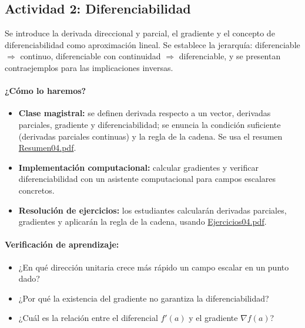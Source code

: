 \documentclass[a4,11pt]{aleph-notas}
\begin{document}
\subsection*{Actividad 2: Diferenciabilidad}
Se introduce la derivada direccional y parcial, el gradiente y el concepto de diferenciabilidad como aproximación lineal. Se establece la jerarquía: diferenciable $\Rightarrow$ continuo, diferenciable con continuidad $\Rightarrow$ diferenciable, y se presentan contraejemplos para las implicaciones inversas.

\paragraph{¿Cómo lo haremos?}
\begin{itemize}[leftmargin=*]
    \item \textbf{Clase magistral:} se definen derivada respecto a un vector, derivadas parciales, gradiente y diferenciabilidad; se enuncia la condición suficiente (derivadas parciales continuas) y la regla de la cadena. Se usa el resumen \href{https://andres-merino.github.io/MatematicaIII-05-N0051/01Resumen/Resumen04.pdf}{Resumen04.pdf}.
    \item \textbf{Implementación computacional:} calcular gradientes y verificar diferenciabilidad con un asistente computacional para campos escalares concretos.
    \item \textbf{Resolución de ejercicios:} los estudiantes calcularán derivadas parciales, gradientes y aplicarán la regla de la cadena, usando \href{https://andres-merino.github.io/MatematicaIII-05-N0051/04Ejercicios/Ejercicios04.pdf}{Ejercicios04.pdf}.
\end{itemize}

\paragraph{Verificación de aprendizaje:}
\begin{itemize}[leftmargin=*]
    \item ¿En qué dirección unitaria crece más rápido un campo escalar en un punto dado?
    \item ¿Por qué la existencia del gradiente no garantiza la diferenciabilidad?
    \item ¿Cuál es la relación entre el diferencial $f'(a)$ y el gradiente $\nabla f(a)$?
\end{itemize}

\end{document}
